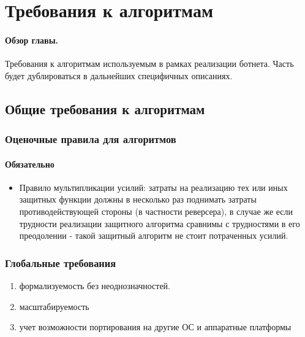 \section{Требования к алгоритмам}
\label{tech_spec}

\paragraph{Обзор главы.\\}

Требования к алгоритмам используемым в рамках реализации ботнета. Часть будет дублироваться
в дальнейших специфичных описаниях.

\subsection{Общие требования к алгоритмам}

\subsubsection{Оценочные правила для алгоритмов}

\paragraph{Обязательно\\}
\begin{itemize}

\item{ Правило мультипликации усилий: затраты на реализацию тех или иных
защитных функции  должны в несколько раз поднимать затраты противодействующей стороны
(в частности реверсера), в случае же если трудности реализации защитного алгоритма
сравнимы с трудностями в его преодолении - такой защитный алгоритм не стоит
потраченных усилий.}

\end{itemize}

\subsubsection{Глобальные требования}
\begin{enumerate}
\item{формализуемость без неоднозначностей.}
\item{масштабируемость}
\item{учет возможности портирования на другие ОС и аппаратные платформы}
\end{enumerate}

